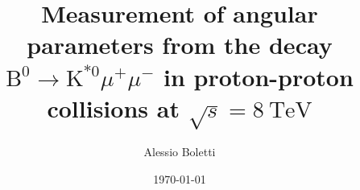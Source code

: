 \documentclass[a4paper,11pt,twoside]{book}
\title{Measurement of angular parameters from the decay $\mathrm{B}^0 \to \mathrm{K}^{*0} \mu^+ \mu^-$ in proton-proton collisions at $\sqrt{s}=8~\mathrm{TeV}$}
\author{Alessio Boletti}
\date{\today}
\begin{document}



\tableofcontents
\clearpage


\clearpage



\clearpage


\clearpage


\clearpage


\clearpage


\clearpage


\clearpage


\clearpage


\clearpage


\clearpage





{}


\end{document}
